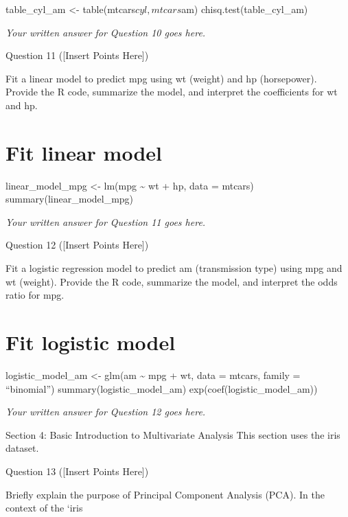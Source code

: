 \documentclass[
  letterpaper,
  DIV=11,
  numbers=noendperiod]{scrartcl}
\begin{document}
table\_cyl\_am \textless- table(mtcars\(cyl, mtcars\)am)
chisq.test(table\_cyl\_am)

\emph{Your written answer for Question 10 goes here.}

Question 11 ({[}Insert Points Here{]})

Fit a linear model to predict mpg using wt (weight) and hp (horsepower).
Provide the R code, summarize the model, and interpret the coefficients
for wt and hp.

\section{Fit linear model}\label{fit-linear-model}

linear\_model\_mpg \textless- lm(mpg \textasciitilde{} wt + hp, data =
mtcars) summary(linear\_model\_mpg)

\emph{Your written answer for Question 11 goes here.}

Question 12 ({[}Insert Points Here{]})

Fit a logistic regression model to predict am (transmission type) using
mpg and wt (weight). Provide the R code, summarize the model, and
interpret the odds ratio for mpg.

\section{Fit logistic model}\label{fit-logistic-model}

logistic\_model\_am \textless- glm(am \textasciitilde{} mpg + wt, data =
mtcars, family = ``binomial'') summary(logistic\_model\_am)
exp(coef(logistic\_model\_am))

\emph{Your written answer for Question 12 goes here.}

Section 4: Basic Introduction to Multivariate Analysis This section uses
the iris dataset.

Question 13 ({[}Insert Points Here{]})

Briefly explain the purpose of Principal Component Analysis (PCA). In
the context of the `iris
\end{document}

